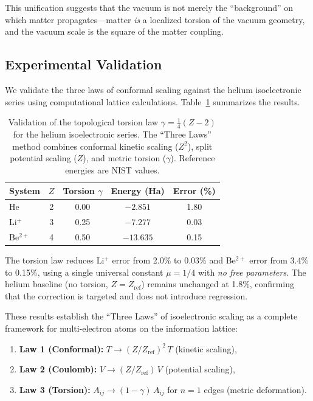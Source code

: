 \documentclass[aps,prd,twocolumn,superscriptaddress,groupedaddress,showpacs]{revtex4-2}
\begin{document}
This unification suggests that the vacuum is not merely the ``background'' on which matter propagates---matter \emph{is} a localized torsion of the vacuum geometry, and the vacuum scale is the square of the matter coupling.

\subsection{Experimental Validation}

We validate the three laws of conformal scaling against the helium isoelectronic series using computational lattice calculations. Table~\ref{tab:torsion_validation} summarizes the results.

\begin{table}[h]
\centering
\caption{Validation of the topological torsion law $\gamma = \frac{1}{4}(Z - 2)$ for the helium isoelectronic series. The ``Three Laws'' method combines conformal kinetic scaling ($Z^2$), split potential scaling ($Z$), and metric torsion ($\gamma$). Reference energies are NIST values.}
\label{tab:torsion_validation}
\begin{tabular}{lcccc}
\toprule
System & $Z$ & Torsion $\gamma$ & Energy (Ha) & Error (\%) \\
\midrule
He       & 2 & 0.00 & $-2.851$ & 1.80 \\
Li$^+$   & 3 & 0.25 & $-7.277$ & 0.03 \\
Be$^{2+}$ & 4 & 0.50 & $-13.635$ & 0.15 \\
\bottomrule
\end{tabular}
\end{table}

The torsion law reduces Li$^+$ error from 2.0\% to 0.03\% and Be$^{2+}$ error from 3.4\% to 0.15\%, using a single universal constant $\mu = 1/4$ with \emph{no free parameters}. The helium baseline (no torsion, $Z = Z_{\text{ref}}$) remains unchanged at 1.8\%, confirming that the correction is targeted and does not introduce regression.

These results establish the ``Three Laws'' of isoelectronic scaling as a complete framework for multi-electron atoms on the information lattice:
\begin{enumerate}
\item \textbf{Law 1 (Conformal):} $T \to (Z/Z_{\text{ref}})^2 \, T$ \quad (kinetic scaling),
\item \textbf{Law 2 (Coulomb):} $V \to (Z/Z_{\text{ref}}) \, V$ \quad (potential scaling),
\item \textbf{Law 3 (Torsion):} $A_{ij} \to (1 - \gamma) \, A_{ij}$ for $n=1$ edges \quad (metric deformation).
\end{enumerate}
\end{document}
